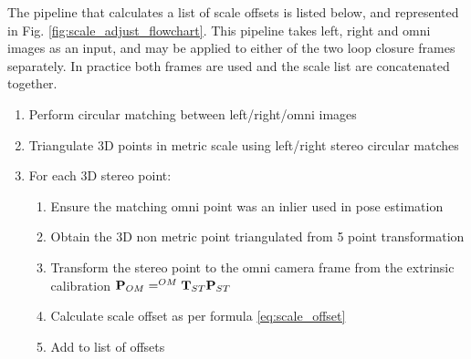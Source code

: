 The pipeline that calculates a list of scale offsets is listed below, and represented in Fig. \ref{fig:scale_adjust_flowchart}.  This pipeline takes left, right and omni images as an input, and may be applied to either of the two loop closure frames separately.  In practice both frames are used and the scale list are concatenated together.

\begin{enumerate}
\itemsep0em
 \item Perform circular matching between left/right/omni images %
 \item Triangulate 3D points in metric scale using left/right stereo circular matches
 \item For each 3D stereo point:
 \begin{enumerate}
   \item Ensure the matching omni point was an inlier used in pose estimation
   \item Obtain the 3D non metric point triangulated from 5 point transformation
   \item Transform the stereo point to the omni camera frame from the extrinsic calibration $\mathbf P_{OM} =  ^{OM}\mathbf T_{ST} \mathbf P_{ST}$
   \item Calculate scale offset as per formula \ref{eq:scale_offset} %
   \item Add to list of offsets 
 \end{enumerate}
\end{enumerate} 

